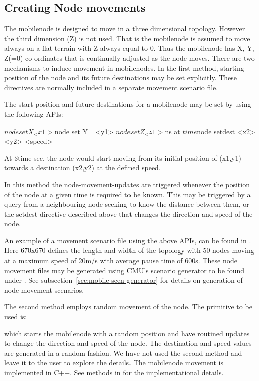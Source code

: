 \subsection{Creating Node movements}
\label{sec:mobilenode-movements}

The mobilenode is designed to move in a three dimensional topology. However the third dimension (Z) is not used. That is the mobilenode is assumed to move always on a flat terrain with Z always equal to 0.
Thus the mobilenode has X, Y, Z(=0) co-ordinates that is continually adjusted as the node moves. There are two mechanisms to induce movement in mobilenodes. 
In the first method, starting position of the node and its future destinations may be set explicitly. These directives are normally included in a separate movement scenario file. 

The start-position and future destinations for a mobilenode may be set
by using the following APIs:
\begin{program}
$node set X_ <x1>
$node set Y_ <y1>
$node set Z_ <z1>

$ns at $time $node setdest <x2> <y2> <speed> 
\end{program}
At \$time sec, the node would start moving from its initial position 
of (x1,y1) towards a destination (x2,y2) at the defined speed.

In this method the node-movement-updates are triggered whenever the
position of the node at a given time is required to be known. This
may be triggered by a query from a neighbouring node seeking to know
the distance between them, or the setdest directive
described above that changes the direction and speed of the node.

An example of a movement scenario file using the above APIs, can be
found in . Here
670x670 defines the length and width of the topology with 50 nodes
moving at a maximum speed of 20m/s with average pause time of
600s. These node movement files may be generated using CMU's scenario
generator to be found under
. See 
subsection~\ref{sec:mobile-scen-generator} for details on generation
of node movement scenarios. 

The second method employs random movement of the node. The primitive
to be used is:
which starts the mobilenode with a random position and have routined
updates to change the direction and speed of the node. The destination
and speed values are generated in a random fashion. We have not used
the second method and leave it to the user to 
explore the details. 
The mobilenode movement is implemented in C++. See methods in
 for the implementational details.

